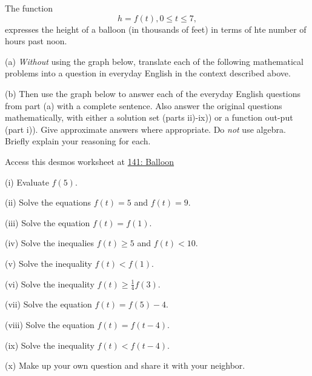 \documentclass{ximera}
\begin{document}
\begin{example}  \label{Ex:er044}
The function
\[
    h = f(t) , 0\leq t \leq 7 ,
\]
expresses the height of a balloon (in thousands of feet) in terms of hte number of hours past noon.

(a) \emph{Without} using the graph below, translate each of the following mathematical problems into a question in everyday English in  the context described above.

(b) Then use the graph below to answer each of the everyday English questions from part (a) with a complete sentence. Also answer the original questions mathematically, with either a solution set (parts ii)-ix)) or a function out-put (part i)). Give approximate answers where appropriate. Do \emph{not} use algebra. Briefly explain your reasoning for each.



 
\begin{onlineOnly}
    \begin{center}
\end{center}
\end{onlineOnly}

Access this desmos worksheet at \href{https://www.desmos.com/calculator/ddrjntgogr}{141: Balloon}


(i) Evaluate $f(5)$.

(ii) Solve the equations $f(t)=5$ and $f(t)=9$.

(iii) Solve the equation $f(t)=f(1)$.

(iv) Solve the inequalies $f(t)\geq 5$ and $f(t)<10$.

(v) Solve the inequality $f(t)< f(1)$.

(vi) Solve the inequality $f(t)\geq \frac{1}{4}f(3)$.

(vii) Solve the equation $f(t)=f(5) - 4$.

(viii) Solve the equation $f(t)=f(t-4)$.

(ix) Solve the inequality $f(t)<f(t-4)$.

(x) Make up your own question and share it with your neighbor.

\end{example}
\end{document}
